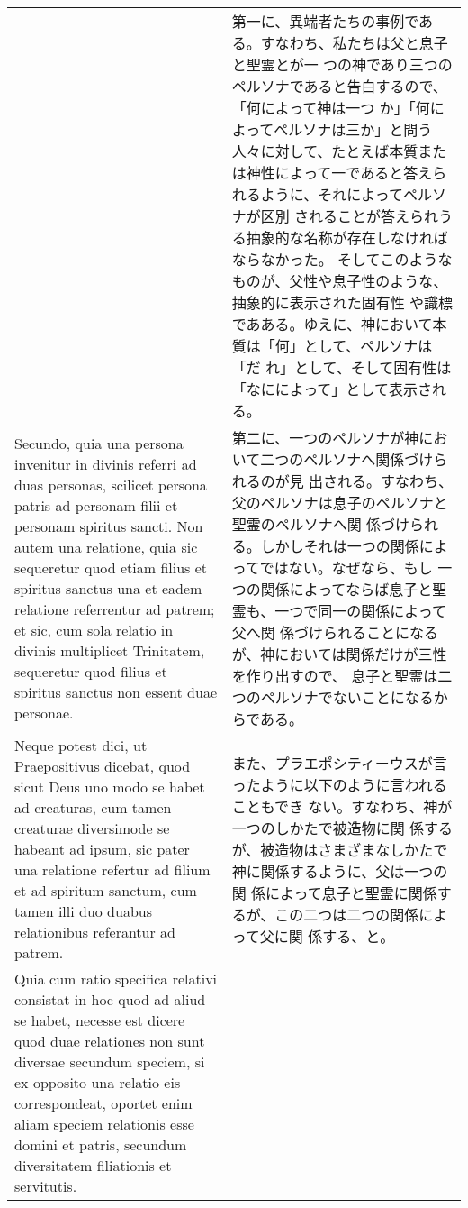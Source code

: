 \documentclass[10pt]{jsarticle} %
\begin{document}
\begin{longtable}{p{21em}p{21em}}
&

第一に、異端者たちの事例である。すなわち、私たちは父と息子と聖霊とが一
 つの神であり三つのペルソナであると告白するので、「何によって神は一つ
 か」「何によってペルソナは三か」と問う人々に対して、たとえば本質また
 は神性によって一であると答えられるように、それによってペルソナが区別
 されることが答えられうる抽象的な名称が存在しなければならなかった。
そしてこのようなものが、父性や息子性のような、抽象的に表示された固有性
 や識標であある。ゆえに、神において本質は「何」として、ペルソナは「だ
 れ」として、そして固有性は「なにによって」として表示される。




\\

Secundo, quia una persona invenitur in divinis referri ad duas
personas, scilicet persona patris ad personam filii et personam
spiritus sancti. Non autem una relatione, quia sic sequeretur quod
etiam filius et spiritus sanctus una et eadem relatione referrentur ad
patrem; et sic, cum sola relatio in divinis multiplicet Trinitatem,
sequeretur quod filius et spiritus sanctus non essent duae
personae. 


&

第二に、一つのペルソナが神において二つのペルソナへ関係づけられるのが見
 出される。すなわち、父のペルソナは息子のペルソナと聖霊のペルソナへ関
 係づけられる。しかしそれは一つの関係によってではない。なぜなら、もし
 一つの関係によってならば息子と聖霊も、一つで同一の関係によって父へ関
 係づけられることになるが、神においては関係だけが三性を作り出すので、
 息子と聖霊は二つのペルソナでないことになるからである。


\\


Neque potest dici, ut Praepositivus dicebat, quod sicut Deus
uno modo se habet ad creaturas, cum tamen creaturae diversimode se
habeant ad ipsum, sic pater una relatione refertur ad filium et ad
spiritum sanctum, cum tamen illi duo duabus relationibus referantur ad
patrem. 


&

また、プラエポシティーウスが言ったように以下のように言われることもでき
 ない。すなわち、神が一つのしかたで被造物に関
 係するが、被造物はさまざまなしかたで神に関係するように、父は一つの関
 係によって息子と聖霊に関係するが、この二つは二つの関係によって父に関
 係する、と。

\\

Quia cum ratio specifica relativi consistat in hoc quod ad
aliud se habet, necesse est dicere quod duae relationes non sunt
diversae secundum speciem, si ex opposito una relatio eis
correspondeat, oportet enim aliam speciem relationis esse domini et
patris, secundum diversitatem filiationis et servitutis. 


\end{longtable}
\end{document}
